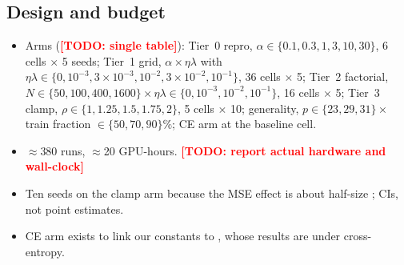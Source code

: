 \documentclass[a4paper,11pt]{article} %
\newcommand{\TODO}[1]{\textcolor{red}{\textbf{[TODO: #1]}}}
\begin{document}
\subsection{Design and budget}
\begin{itemize}
	\item Arms (\TODO{single table}): Tier~0 repro, $\alpha\in\{0.1,0.3,1,3,10,30\}$,
		6 cells $\times$ 5 seeds; Tier~1 grid, $\alpha\times\eta\lambda$ with
		$\eta\lambda\in\{0,10^{-3},3\!\times\!10^{-3},10^{-2},3\!\times\!10^{-2},10^{-1}\}$,
		36 cells $\times$ 5; Tier~2 factorial, $N\in\{50,100,400,1600\}\times
		\eta\lambda\in\{0,10^{-3},10^{-2},10^{-1}\}$, 16 cells $\times$ 5; Tier~3
		clamp, $\rho\in\{1,1.25,1.5,1.75,2\}$, 5 cells $\times$ 10; generality,
		$p\in\{23,29,31\}\times$ train fraction $\in\{50,70,90\}\%$; CE arm at the
		baseline cell.
	\item $\approx$380 runs, $\approx$20 GPU-hours. \TODO{report actual hardware
		and wall-clock}
	\item Ten seeds on the clamp arm because the MSE effect is about half-size
		\citep{truong2026logit}; CIs, not point estimates.
	\item CE arm exists to link our constants to \citet{truong2026norm}, whose
		results are under cross-entropy.
\end{itemize}
\end{document}
